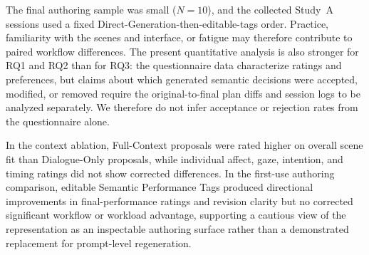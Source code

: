 The final authoring sample was small ($N=10$), and the collected Study~A
sessions used a fixed Direct-Generation-then-editable-tags order. Practice,
familiarity with the scenes and interface, or fatigue may therefore contribute
to paired workflow differences. The present quantitative analysis is also
stronger for RQ1 and RQ2 than for RQ3: the questionnaire data characterize
ratings and preferences, but claims about which generated semantic decisions
were accepted, modified, or removed require the original-to-final plan diffs
and session logs to be analyzed separately. We therefore do not infer
acceptance or rejection rates from the questionnaire alone.

In the context ablation, Full-Context proposals were rated higher on overall
scene fit than Dialogue-Only proposals, while individual affect, gaze, intention,
and timing ratings did not show corrected differences. In the first-use
authoring comparison, editable Semantic Performance Tags produced directional
improvements in final-performance ratings and revision clarity but no corrected
significant workflow or workload advantage, supporting a cautious view of the
representation as an inspectable authoring surface rather than a demonstrated
replacement for prompt-level regeneration.
